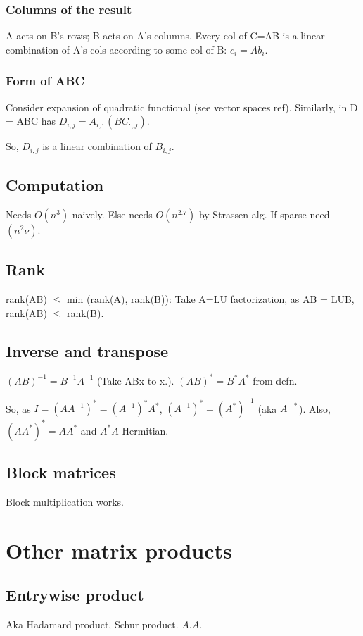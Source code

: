 \documentclass[oneside, article]{memoir}
\begin{document}
\subsubsection{Columns of the result}
A acts on B's rows; B acts on A's columns. Every col of C=AB is a linear combination of A's cols according to some col of B: $c_i = Ab_i$.

\subsubsection{Form of ABC}
Consider expansion of quadratic functional (see vector spaces ref). Similarly, in D = ABC has $D_{i,j} = A_{i,:}(BC_{:,j})$.

So, $D_{i,j}$ is a linear combination of $B_{i,j}$.

\subsection{Computation}
Needs $O(n^{3})$ naively. Else needs $O(n^{2.7})$ by Strassen alg. If sparse need $(n^{2}\nu)$.

\subsection{Rank}
rank(AB) $\leq$ min (rank(A), rank(B)): Take A=LU factorization, as AB = LUB, rank(AB) $\leq$ rank(B).

\subsection{Inverse and transpose}
$(AB)^{-1}=B^{-1}A^{-1}$ (Take ABx to x.). $(AB)^{*}=B^{*}A^{*}$ from defn.

So, as $I = (AA^{-1})^{*} = (A^{-1})^{*}A^{*}$, $(A^{-1})^{*} = (A^{*})^{-1}$ (aka $A^{-*}$). Also, $(AA^{*})^{*} = AA^{*}$ and $A^{*}A$ Hermitian.

\subsection{Block matrices}
Block multiplication works.

\section{Other matrix products}
\subsection{Entrywise product}
Aka Hadamard product, Schur product. $A.A$.
\end{document}
